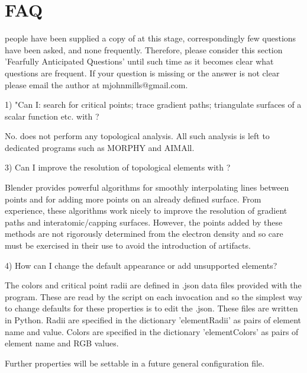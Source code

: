 \chapter{FAQ}

 people have been supplied a copy of \programName{} at this stage, correspondingly few questions have been asked, and none frequently. Therefore, please consider this section 'Fearfully Anticipated Questions' until such time as it becomes clear what questions are frequent. If your question is missing or the answer is not clear please email the author at mjohnmills@gmail.com.

1) "Can I: search for critical points; trace gradient paths; triangulate surfaces of a scalar function etc. with \programName{}?

No. \programName{} does not perform any topological analysis. All such analysis is left to dedicated programs such as MORPHY and AIMAll.

3) Can I improve the resolution of topological elements with \programName{}?

Blender provides powerful algorithms for smoothly interpolating lines between points and for adding more points on an already defined surface. From experience, these algorithms work nicely to improve the resolution of gradient paths and interatomic/capping surfaces. However, the points added by these methods are not rigorously determined from the electron density and so care must be exercised in their use to avoid the introduction of artifacts.

4) How can I change the default appearance or add unsupported elements?

The colors and critical point radii are defined in .json data files provided with the program. These are read by the script on each invocation and so the simplest way to change defaults for these properties is to edit the .json. These files are written in Python. Radii are specified in the dictionary 'elementRadii' as pairs of element name and value. Colors are specified in the dictionary 'elementColors' as pairs of element name and RGB values.

Further properties will be settable in a future general configuration file.